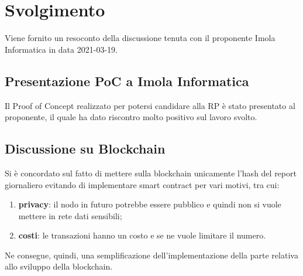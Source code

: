 \section{Svolgimento}
Viene fornito un resoconto della discussione tenuta con il proponente Imola Informatica in data 2021-03-19.

\subsection*{Presentazione PoC a Imola Informatica}
Il Proof of Concept realizzato per potersi candidare alla RP è stato presentato al proponente, il quale ha dato riscontro molto positivo sul lavoro svolto.

\subsection*{Discussione su Blockchain}
Si è concordato sul fatto di mettere sulla blockchain unicamente l'hash del report giornaliero evitando di implementare smart contract per vari motivi, tra cui:
\begin{enumerate}
	\item \textbf{privacy}: il nodo in futuro potrebbe essere pubblico e quindi non si vuole mettere in rete dati sensibili;
	\item \textbf{costi}: le transazioni hanno un costo e se ne vuole limitare il numero.
\end{enumerate}
Ne consegue, quindi, una semplificazione dell'implementazione della parte relativa allo sviluppo della blockchain.





